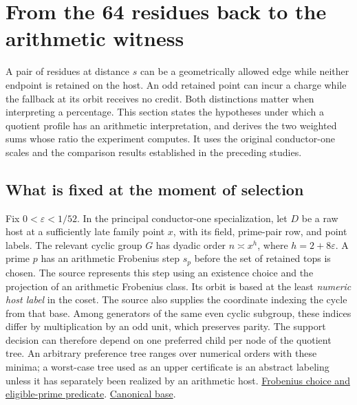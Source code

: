 \section{From the 64 residues back to the arithmetic witness}
\label{sec:arithmetic-transport}

A pair of residues at distance \(s\) can be a geometrically allowed edge while neither endpoint is retained on the host. An odd retained point can incur a charge while the fallback at its orbit receives no credit. Both distinctions matter when interpreting a percentage. This section states the hypotheses under which a quotient profile has an arithmetic interpretation, and derives the two weighted sums whose ratio the experiment computes. It uses the original conductor-one scales and the comparison results established in the preceding studies.

\subsection{What is fixed at the moment of selection}

Fix \(0<\varepsilon<1/52\). In the principal conductor-one specialization, let \(D\) be a raw host at a sufficiently late family point \(x\), with its field, prime-pair row, and point labels. The relevant cyclic group \(G\) has dyadic order \(n\asymp x^h\), where \(h=2+8\varepsilon\). A prime \(p\) has an arithmetic Frobenius step \(s_p\) before the set of retained tops is chosen. The source represents this step using an existence choice and the projection of an arithmetic Frobenius class. Its orbit is based at the least \emph{numeric host label} in the coset. The source also supplies the coordinate indexing the cycle from that base. Among generators of the same even cyclic subgroup, these indices differ by multiplication by an odd unit, which preserves parity. The support decision can therefore depend on one preferred child per node of the quotient tree. An arbitrary preference tree ranges over numerical orders with these minima; a worst-case tree used as an upper certificate is an abstract labeling unless it has separately been realized by an arithmetic host.
\href{https://github.com/nousentllc/riemann-hypothesis/blob/40e56bab026552e089d7afcfeff08d2defb9c005/src/Development/AbelianVarietyTheory/Definitions/GlobalTwisting/ThinScalesIffHostBound.lean#L19-L41}{Frobenius choice and eligible-prime predicate}.
\href{https://github.com/nousentllc/riemann-hypothesis/blob/40e56bab026552e089d7afcfeff08d2defb9c005/src/Formalism/LocalToGlobal/GlobalTheory/IsResidueClassZero.lean#L264-L275}{Canonical base}.

